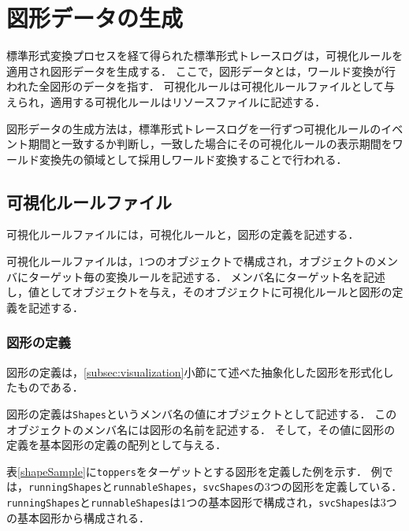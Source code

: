 \section{図形データの生成}

標準形式変換プロセスを経て得られた標準形式トレースログは，可視化ルールを適用され図形データを生成する．
ここで，図形データとは，ワールド変換が行われた全図形のデータを指す．
可視化ルールは可視化ルールファイルとして与えられ，適用する可視化ルールはリソースファイルに記述する．

図形データの生成方法は，標準形式トレースログを一行ずつ可視化ルールのイベント期間と一致するか判断し，一致した場合にその可視化ルールの表示期間をワールド変換先の領域として採用しワールド変換することで行われる．

\subsection{可視化ルールファイル}
\label{visualizeRuleSection}
可視化ルールファイルには，可視化ルールと，図形の定義を記述する．

可視化ルールファイルは，1つのオブジェクトで構成され，オブジェクトのメンバにターゲット毎の変換ルールを記述する．
メンバ名にターゲット名を記述し，値としてオブジェクトを与え，そのオブジェクトに可視化ルールと図形の定義を記述する．

\subsubsection{図形の定義}

図形の定義は，\ref{subsec:visualization}小節にて述べた抽象化した図形を形式化したものである．

図形の定義は{\tt Shapes}というメンバ名の値にオブジェクトとして記述する．
このオブジェクトのメンバ名には図形の名前を記述する．
そして，その値に図形の定義を基本図形の定義の配列として与える．

表\ref{shapeSample}に{\tt toppers}をターゲットとする図形を定義した例を示す．
例では，{\tt runningShapes}と{\tt runnableShapes}，{\tt svcShapes}の3つの図形を定義している．
{\tt runningShapes}と{\tt runnableShapes}は1つの基本図形で構成され，{\tt svcShapes}は3つの基本図形から構成される．


